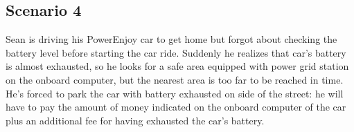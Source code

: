 \subsection{Scenario 4}
Sean is driving his PowerEnjoy car to get home but forgot about checking the battery level before starting the car ride.
Suddenly he realizes that car’s battery is almost exhausted, so he looks for a safe area equipped with power grid station on the onboard computer, but the nearest area is too far to be reached in time. He’s forced to park the car with battery exhausted on side of the street: he will have to pay the amount of money indicated on the onboard computer of the car plus an additional fee for having exhausted the car's battery. 